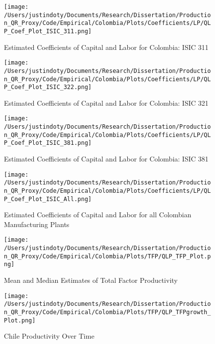 \documentclass[11pt]{article}
\begin{document}
\begin{figure}[H]
\centering
\caption{Estimated Coefficients of Capital and Labor for Colombia: ISIC 311}
\texttt{[image: /Users/justindoty/Documents/Research/Dissertation/Production\_QR\_Proxy/Code/Empirical/Colombia/Plots/Coefficients/LP/QLP\_Coef\_Plot\_ISIC\_311.png]}
\label{fig:LPCOL311}
\end{figure}

\begin{figure}[H]
\centering
\caption{Estimated Coefficients of Capital and Labor for Colombia: ISIC 321}
\texttt{[image: /Users/justindoty/Documents/Research/Dissertation/Production\_QR\_Proxy/Code/Empirical/Colombia/Plots/Coefficients/LP/QLP\_Coef\_Plot\_ISIC\_322.png]}
\label{fig:LPCOL321}
\end{figure}

\begin{figure}[H]
\centering
\caption{Estimated Coefficients of Capital and Labor for Colombia: ISIC 381}
\texttt{[image: /Users/justindoty/Documents/Research/Dissertation/Production\_QR\_Proxy/Code/Empirical/Colombia/Plots/Coefficients/LP/QLP\_Coef\_Plot\_ISIC\_381.png]}
\label{fig:LPCOL381}
\end{figure}

\begin{figure}[H]
\centering
\caption{Estimated Coefficients of Capital and Labor for all Colombian Manufacturing Plants}
\texttt{[image: /Users/justindoty/Documents/Research/Dissertation/Production\_QR\_Proxy/Code/Empirical/Colombia/Plots/Coefficients/LP/QLP\_Coef\_Plot\_ISIC\_All.png]}
\label{fig:LPCOLall}
\end{figure}

\begin{figure}[H]
\centering
\caption{Mean and Median Estimates of Total Factor Productivity}
\texttt{[image: /Users/justindoty/Documents/Research/Dissertation/Production\_QR\_Proxy/Code/Empirical/Colombia/Plots/TFP/QLP\_TFP\_Plot.png]}
\label{fig:LPTFPDens}
\end{figure}

\begin{figure}[H]
\centering
\caption{Chile Productivity Over Time}
\texttt{[image: /Users/justindoty/Documents/Research/Dissertation/Production\_QR\_Proxy/Code/Empirical/Colombia/Plots/TFP/QLP\_TFPgrowth\_Plot.png]}
\label{fig:LPCHLpgrowth}
\end{figure}
\end{document}
